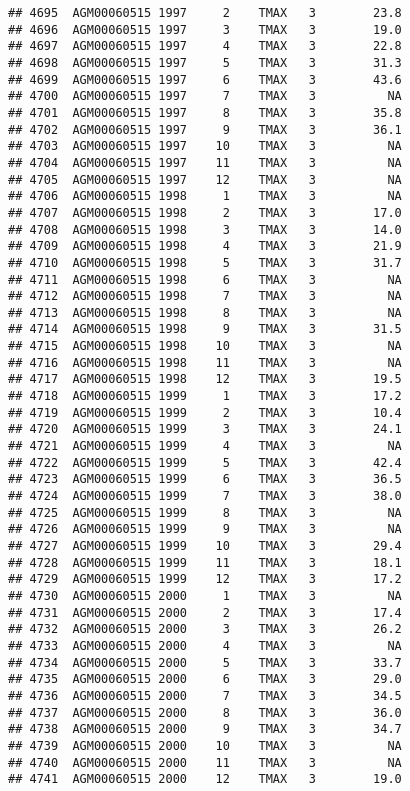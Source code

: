 \documentclass{article}\usepackage[]{graphicx}\usepackage[]{color}
\makeatletter
\newenvironment{kframe}{%
 \def\at@end@of@kframe{}%
 \ifinner\ifhmode%
  \def\at@end@of@kframe{\end{minipage}}%
  \begin{minipage}{\columnwidth}%
 \fi\fi%
 \def\FrameCommand##1{\hskip\@totalleftmargin \hskip-\fboxsep
 \colorbox{shadecolor}{##1}\hskip-\fboxsep
     \hskip-\linewidth \hskip-\@totalleftmargin \hskip\columnwidth}%
 \MakeFramed {\advance\hsize-\width
   \@totalleftmargin\z@ \linewidth\hsize
   \@setminipage}}%
 {\par\unskip\endMakeFramed%
 \at@end@of@kframe}
\newenvironment{knitrout}{}{} %
\makeatother
\begin{document}
\begin{knitrout}
\begin{kframe}
\begin{verbatim}
## 4695  AGM00060515 1997     2    TMAX   3        23.8
## 4696  AGM00060515 1997     3    TMAX   3        19.0
## 4697  AGM00060515 1997     4    TMAX   3        22.8
## 4698  AGM00060515 1997     5    TMAX   3        31.3
## 4699  AGM00060515 1997     6    TMAX   3        43.6
## 4700  AGM00060515 1997     7    TMAX   3          NA
## 4701  AGM00060515 1997     8    TMAX   3        35.8
## 4702  AGM00060515 1997     9    TMAX   3        36.1
## 4703  AGM00060515 1997    10    TMAX   3          NA
## 4704  AGM00060515 1997    11    TMAX   3          NA
## 4705  AGM00060515 1997    12    TMAX   3          NA
## 4706  AGM00060515 1998     1    TMAX   3          NA
## 4707  AGM00060515 1998     2    TMAX   3        17.0
## 4708  AGM00060515 1998     3    TMAX   3        14.0
## 4709  AGM00060515 1998     4    TMAX   3        21.9
## 4710  AGM00060515 1998     5    TMAX   3        31.7
## 4711  AGM00060515 1998     6    TMAX   3          NA
## 4712  AGM00060515 1998     7    TMAX   3          NA
## 4713  AGM00060515 1998     8    TMAX   3          NA
## 4714  AGM00060515 1998     9    TMAX   3        31.5
## 4715  AGM00060515 1998    10    TMAX   3          NA
## 4716  AGM00060515 1998    11    TMAX   3          NA
## 4717  AGM00060515 1998    12    TMAX   3        19.5
## 4718  AGM00060515 1999     1    TMAX   3        17.2
## 4719  AGM00060515 1999     2    TMAX   3        10.4
## 4720  AGM00060515 1999     3    TMAX   3        24.1
## 4721  AGM00060515 1999     4    TMAX   3          NA
## 4722  AGM00060515 1999     5    TMAX   3        42.4
## 4723  AGM00060515 1999     6    TMAX   3        36.5
## 4724  AGM00060515 1999     7    TMAX   3        38.0
## 4725  AGM00060515 1999     8    TMAX   3          NA
## 4726  AGM00060515 1999     9    TMAX   3          NA
## 4727  AGM00060515 1999    10    TMAX   3        29.4
## 4728  AGM00060515 1999    11    TMAX   3        18.1
## 4729  AGM00060515 1999    12    TMAX   3        17.2
## 4730  AGM00060515 2000     1    TMAX   3          NA
## 4731  AGM00060515 2000     2    TMAX   3        17.4
## 4732  AGM00060515 2000     3    TMAX   3        26.2
## 4733  AGM00060515 2000     4    TMAX   3          NA
## 4734  AGM00060515 2000     5    TMAX   3        33.7
## 4735  AGM00060515 2000     6    TMAX   3        29.0
## 4736  AGM00060515 2000     7    TMAX   3        34.5
## 4737  AGM00060515 2000     8    TMAX   3        36.0
## 4738  AGM00060515 2000     9    TMAX   3        34.7
## 4739  AGM00060515 2000    10    TMAX   3          NA
## 4740  AGM00060515 2000    11    TMAX   3          NA
## 4741  AGM00060515 2000    12    TMAX   3        19.0

\end{verbatim}
\end{kframe}
\end{knitrout}
\end{document}
